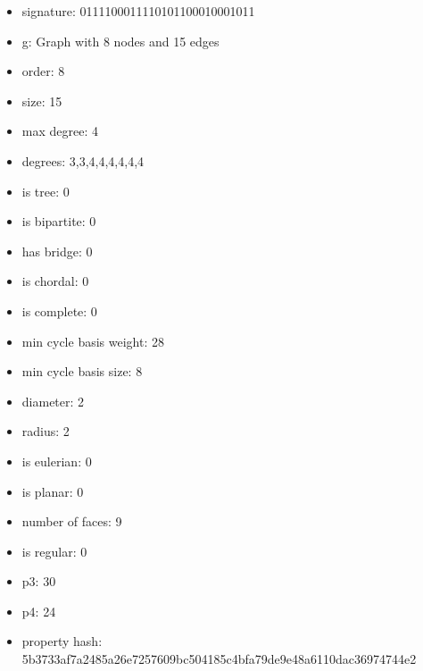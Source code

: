 \begin{itemize}
\item signature: 0111100011110101100010001011
\item g: Graph with 8 nodes and 15 edges
\item order: 8
\item size: 15
\item max degree: 4
\item degrees: 3,3,4,4,4,4,4,4
\item is tree: 0
\item is bipartite: 0
\item has bridge: 0
\item is chordal: 0
\item is complete: 0
\item min cycle basis weight: 28
\item min cycle basis size: 8
\item diameter: 2
\item radius: 2
\item is eulerian: 0
\item is planar: 0
\item number of faces: 9
\item is regular: 0
\item p3: 30
\item p4: 24
\item property hash: 5b3733af7a2485a26e7257609bc504185c4bfa79de9e48a6110dac36974744e2
\end{itemize}
\newpage
\begin{figure}
\end{figure}
